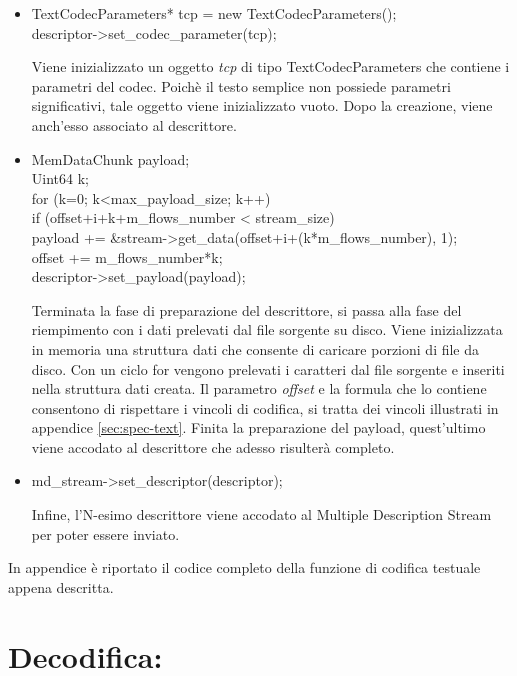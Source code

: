 \begin{itemize}
 \item \begin{code}
TextCodecParameters* tcp = new TextCodecParameters();\\
descriptor->set\_codec\_parameter(tcp);\\
\end{code}
Viene inizializzato un oggetto \textit{tcp} di tipo TextCodecParameters che
contiene i parametri del codec. Poichè il testo semplice non possiede parametri significativi, tale oggetto viene inizializzato vuoto. Dopo la creazione, viene anch'esso associato al descrittore.

 \item \begin{code}
MemDataChunk payload;\\
Uint64 k;\\
for (k=0; k<max\_payload\_size; k++)\\
	if (offset+i+k+m\_flows\_number < stream\_size)\\
		payload += \&stream->get\_data(offset+i+(k*m\_flows\_number), 1);\\
offset += m\_flows\_number*k;\\
descriptor->set\_payload(payload);\\
\end{code}
Terminata la fase di preparazione del descrittore, si passa alla fase del
riempimento con i dati prelevati dal file sorgente su disco. Viene inizializzata
in memoria una struttura dati che consente di caricare porzioni di file da disco.
Con un ciclo for vengono prelevati i caratteri dal file sorgente e inseriti nella
struttura dati creata. Il parametro \textit{offset} e la formula che lo contiene
consentono di rispettare i vincoli di codifica, si tratta dei vincoli illustrati
in appendice \ref{sec:spec-text}. Finita la preparazione del payload,
quest'ultimo viene accodato al descrittore che adesso risulterà completo.

 \item \begin{code}
md\_stream->set\_descriptor(descriptor);\\
\end{code}
Infine, l'N-esimo descrittore viene accodato al Multiple Description Stream per poter essere inviato.
\end{itemize}
In appendice è riportato il codice completo della funzione di codifica testuale
appena descritta.


\section{Decodifica:}

